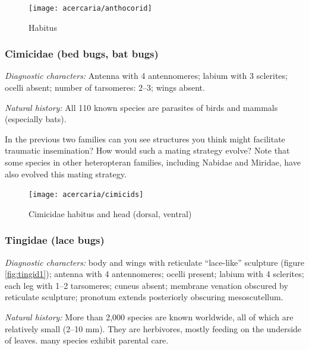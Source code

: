 \begin{figure}[ht!]
 \centering
 \texttt{[image: acercaria/anthocorid]}
 \caption{Habitus \citep[redrawn from][Fig. 15K]{prins1984morphological}}
 \label{fig:anthocorid1}
\end{figure}

\subsubsection{Cimicidae (bed bugs, bat bugs)}
\noindent{}\textit{Diagnostic characters:} Antenna with 4 antennomeres; labium with 3 sclerites; ocelli absent; number of tarsomeres: 2--3; wings absent.\vspace{3mm}

\noindent{}\textit{Natural history:} All 110 known species are parasites of birds and mammals (especially bats).\vspace{3mm}

\begin{theo}
{}In the previous two families can you see structures you think might facilitate traumatic insemination? How would such a mating strategy evolve? Note that some species in other heteropteran families, including Nabidae and Miridae, have also evolved this mating strategy.
\end{theo}

\begin{figure}[ht!]
 \centering
 \texttt{[image: acercaria/cimicids]}
 \caption{Cimicidae habitus and head (dorsal, ventral) \citep[Modified from Fig. 38A in][]{snodgrass1944feeding}}
 \label{fig:cimicid1}
\end{figure}

\subsubsection{Tingidae (lace bugs)}
\noindent{}\textit{Diagnostic characters:} body and wings with reticulate ``lace-like'' sculpture (figure \ref{fig:tingid1}); antenna with 4 antennomeres; ocelli present; labium with 4 sclerites;  each leg with 1--2 tarsomeres; cuneus absent; membrane venation obscured by reticulate sculpture; pronotum extends posteriorly obscuring mesoscutellum.\vspace{3mm}

\noindent{}\textit{Natural history:} More than 2,000 species are known worldwide, all of which are relatively small (2--10 mm). They are herbivores, mostly feeding on the underside of leaves. many species exhibit parental care.\vspace{3mm}

